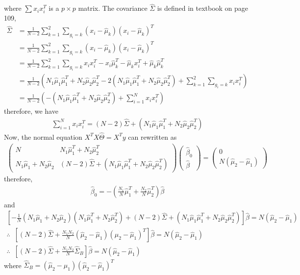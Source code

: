 \documentclass[pra,groupedaddress,amsmath,amssymb, column]{revtex4}
\begin{document}
where $\sum x_i x_i^T$ is a $p \times p$ matrix.
The covariance $\hat\Sigma$ is defined in textbook on page 109,
\begin{align}
\hat{\Sigma} &= \frac{1}{N-2}\sum_{k=1}^2\sum_{g_i=k} (x_i-\hat\mu_k) (x_i-\hat\mu_k)^T  \\
&= \frac{1}{N-2}\sum_{k=1}^2\sum_{g_i=k} (x_i-\hat\mu_k) (x_i-\hat\mu_k)^T  \\
&= \frac{1}{N-2}\sum_{k=1}^2\sum_{g_i=k} x_ix_i^T - x_i\hat{\mu}_k^T - \hat{\mu}_k  x_i^T+ \hat{\mu}_k\hat{\mu}_k^T\\
 &=\frac{1}{N-2}\left(  N_1 \hat{\mu}_1\hat{\mu}_1^T+N_2 \hat{\mu}_2\hat{\mu}_2^T - 2\left(N_1 \hat{\mu}_1\hat{\mu}_1^T+N_2 \hat{\mu}_2\hat{\mu}_2^T\right)+ \sum_{k=1}^2\sum_{g_i=k} x_ix_i^T \right) \\
 &=\frac{1}{N-2}\left(  -\left(N_1 \hat{\mu}_1\hat{\mu}_1^T+N_2 \hat{\mu}_2\hat{\mu}_2^T\right)+ \sum_{i=1}^N x_ix_i^T \right) 
\end{align}
 therefore, we have
 \begin{align}
 \sum_{i=1}^N x_ix_i^T = (N-2)\hat{\Sigma} + \left(N_1 \hat{\mu}_1\hat{\mu}_1^T+N_2 \hat{\mu}_2\hat{\mu}_2^T\right)
 \end{align}
 Now, the normal equation $X^TX\hat\Theta = X^Ty$ can rewritten as 
\begin{align}
\left( \begin{array}{cc}
	N & N_1\hat{\mu}_1^T + N_2\hat{\mu}_2^T\\
	N_1\hat{\mu}_1 + N_2\hat{\mu}_2& (N-2)\hat{\Sigma} + \left(N_1 \hat{\mu}_1\hat{\mu}_1^T+N_2 \hat{\mu}_2\hat{\mu}_2^T\right)
\end{array} \right)\left( \begin{array}{c}
\hat{\beta}_0 \\ \hat{\beta} \end{array} \right) =
\left( \begin{array}{c}
	0\\ N(  \hat{\mu}_2-\hat{\mu}_1)
\end{array} \right)
\end{align}
therefore,
\begin{align}
\hat{\beta}_0 = - \left(  \frac{N_1}{N}\hat{\mu}_1^T+\frac{N_2}{N}\hat{\mu}_2^T  \right) \hat\beta
\end{align}
and
\begin{align}
\left[ -\frac{1}{N}\left( N_1\hat\mu_1 + N_2\hat\mu_2 \right)\left( N_1\hat\mu_1^T + N_2\hat\mu_2^T \right)+(N-2)\hat{\Sigma} + \left(N_1 \hat{\mu}_1\hat{\mu}_1^T+N_2 \hat{\mu}_2\hat{\mu}_2^T\right) \right]\hat\beta = N(\hat\mu_2-\hat\mu_1)\\
\therefore\;\; \left[(N-2)\hat{\Sigma} + \frac{N_1N_2}{N}(\hat\mu_2-\hat\mu_1)(\hat\mu_2-\hat\mu_1)^T\right]\hat\beta = N(\hat\mu_2-\hat\mu_1)\\
\therefore\;\; \left[(N-2)\hat{\Sigma} +\frac{N_1N_2}{N}\hat{\Sigma}_B\right]\hat\beta = N(\hat\mu_2-\hat\mu_1)
\end{align}
where $\hat{\Sigma}_B= (\hat\mu_2-\hat\mu_1)(\hat\mu_2-\hat\mu_1)^T$
\end{document}

